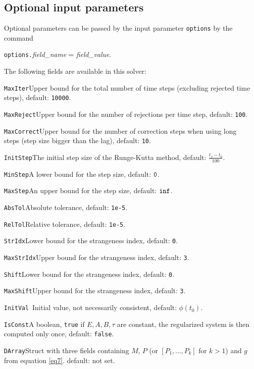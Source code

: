 \documentclass[final,reqno]{siamltex}
\renewenvironment{itemize}[1]{\begin{compactitem}#1}{\end{compactitem}}
\begin{document}
\subsection{Optional input parameters}
Optional parameters can be passed by the input parameter {\tt options} by the command 
\begin{center}
{\tt options.}{\it field\_name} = {\it field\_value}.
\end{center}
The following fields are available in this solver:
\begin{itemize}
\item {\tt MaxIter}\quad        Upper bound for the total number of time steps (excluding 
	rejected time steps), default: {\tt 10000}.
\item {\tt MaxReject}\quad      Upper bound for the number of rejections per time step, default: {\tt 100}.
\item{\tt MaxCorrect}\quad  Upper bound for the number of correction steps when using
         long steps (step size bigger than the lag), default: {\tt10}.
\item {\tt InitStep}\quad        The initial step size of the Runge-Kutta method, default: $\frac{t_f-t_0}{100}$.
\item {\tt MinStep}\quad         A lower bound for the step size, default: $\tt 0$.
\item {\tt MaxStep}\quad      An upper bound for the step size, default: $\tt inf$.
\item {\tt AbsTol}\quad       Absolute tolerance, default:  {\tt 1e-5}.
\item {\tt RelTol}\quad       Relative tolerance, default:  {\tt 1e-5}.
\item {\tt StrIdx}\quad       Lower bound for the strangeness index,  default: {\tt 0}.
\item {\tt MaxStrIdx}\quad    Upper bound for the strangeness index,  default: {\tt 3}.
\item {\tt Shift}\quad       Lower bound for the strangeness index,  default: {\tt 0}.
\item {\tt MaxShift}\quad    Upper bound for the strangeness index,  default: {\tt 3}.
\item {\tt InitVal  }\quad    Initial value, not necessarily consistent,  default: $\phi(t_0)$.
\item {\tt IsConst}\quad   A boolean, {\tt true} if $E,A,B,\tau$ are constant, the regularized system is then computed only once, default: {\tt false}.
\item {\tt DArray}\quad    Struct with three fields containing $M$, $P$ (or $[P_1,\ldots,P_k]$ for $k>1$) and $g$ from equation \eqref{eq7}.  default: not set.
\end{itemize}
\end{document}
